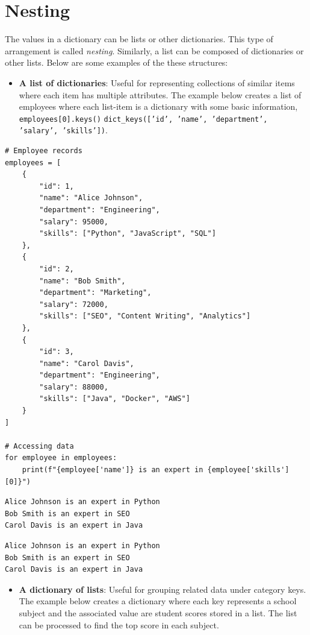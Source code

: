 \documentclass[10pt]{book}
\begin{document}
\section{Nesting}
\label{sec:orgea206b9}
The values in a dictionary can be lists or other dictionaries. This type of arrangement is called \emph{nesting}. Similarly, a list can be composed of dictionaries or other lists. Below are some examples of the these structures:
\begin{itemize}
\item \textbf{A list of dictionaries}: Useful for representing collections of similar items where each item has multiple attributes. The example below creates a list of employees where each list-item is a dictionary with some basic information, \texttt{employees[0].keys()} \texttt{dict\_keys(['id', 'name', 'department', 'salary', 'skills'])}.
\end{itemize}

\label{org95eb5ae}
\begin{verbatim}
# Employee records
employees = [
    {
        "id": 1,
        "name": "Alice Johnson",
        "department": "Engineering",
        "salary": 95000,
        "skills": ["Python", "JavaScript", "SQL"]
    },
    {
        "id": 2,
        "name": "Bob Smith",
        "department": "Marketing",
        "salary": 72000,
        "skills": ["SEO", "Content Writing", "Analytics"]
    },
    {
        "id": 3,
        "name": "Carol Davis",
        "department": "Engineering",
        "salary": 88000,
        "skills": ["Java", "Docker", "AWS"]
    }
]

# Accessing data
for employee in employees:
    print(f"{employee['name']} is an expert in {employee['skills'][0]}")
\end{verbatim}

\label{org18c4c2a}
\begin{verbatim}
Alice Johnson is an expert in Python
Bob Smith is an expert in SEO
Carol Davis is an expert in Java
\end{verbatim}

\label{orgb747dfd}
\begin{verbatim}
Alice Johnson is an expert in Python
Bob Smith is an expert in SEO
Carol Davis is an expert in Java
\end{verbatim}

\begin{itemize}
\item \textbf{A dictionary of lists}: Useful for grouping related data under category keys. The example below creates a dictionary where each key represents a school subject and the associated value are student scores stored in a list. The list can be processed to find the top score in each subject.
\end{itemize}
\end{document}
